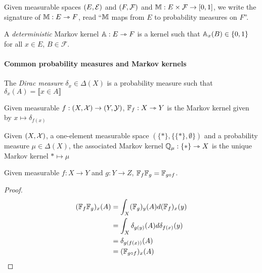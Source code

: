 \begin{notation}
Given measurable spaces $(E,\mathcal{E})$ and $(F,\mathcal{F})$ and $\mathbb{M}:E\times\mathcal{F}\to [0,1]$, we write the signature of $\mathbb{M}:E\rightarrowtriangle F$, read ``$\mathbb{M}$ maps from $E$ to probability measures on $F$''.
\end{notation}

\begin{definition}
A \emph{deterministic} Markov kernel $\mathbb{A}:E\rightarrowtriangle F$ is a kernel such that $\mathbb{A}_x(B)\in\{0,1\}$ for all $x\in E$, $B\in\mathcal{F}$.
\end{definition}

\paragraph{Common probability measures and Markov kernels}

\begin{definition}\label{def:dirac_meas}
The \emph{Dirac measure} $\delta_x\in \Delta(X)$ is a probability measure such that $\delta_x(A)=\llbracket x\in A \rrbracket$
\end{definition}

\begin{definition}\label{def:mkern_func}
Given measurable $f:(X,\mathcal{X})\to (Y,\mathcal{Y})$, $\mathbb{F}_f:X\rightarrowtriangle Y$ is the Markov kernel given by $x\mapsto \delta_{f(x)}$
\end{definition}

\begin{definition}
Given $(X,\mathcal{X})$, a one-element measurable space $(\{*\},\{\{*\},\emptyset\})$ and a probability measure $\mu\in \Delta(X)$, the associated Markov kernel $\mathbb{Q}_\mu:\{*\}\rightarrowtriangle X$ is the unique Markov kernel $*\mapsto \mu$
\end{definition}

\begin{lemma}\label{lem:func_kern_product}
Given measurable $f:X\to Y$ and $g:Y\to Z$, $\mathbb{F}_f\mathbb{F}_g = \mathbb{F}_{g\circ f}$.
\end{lemma}

\begin{proof}
\begin{align}
    (\mathbb{F}_{f}\mathbb{F}_g)_x(A) &= \int_X (\mathbb{F}_g)_y(A) d(\mathbb{F}_f)_x(y)\\
                                      &= \int_X \delta_{g(y)}(A) d\delta_{f(x)}(y)\\
                                      &= \delta_{g(f(x))} (A)\\
                                      &= (\mathbb{F}_{g\circ f})_x(A) 
\end{align}
\end{proof}

